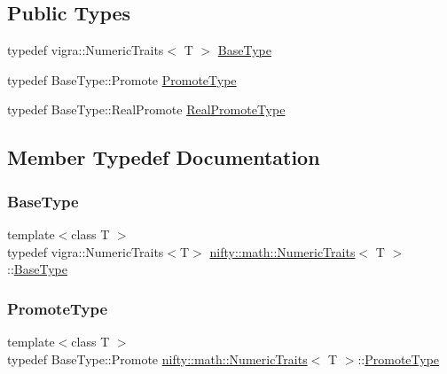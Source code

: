 \subsection*{Public Types}
\begin{DoxyCompactItemize}
\item 
typedef vigra\+::\+Numeric\+Traits$<$ T $>$ \hyperlink{structnifty_1_1math_1_1NumericTraits_abccb0907651fb8a346015c6aad17077e}{Base\+Type}
\item 
typedef Base\+Type\+::\+Promote \hyperlink{structnifty_1_1math_1_1NumericTraits_a001a907b6cbeaaf29fb52ff31261e811}{Promote\+Type}
\item 
typedef Base\+Type\+::\+Real\+Promote \hyperlink{structnifty_1_1math_1_1NumericTraits_a5030d5141aa16424cd49d272306cd716}{Real\+Promote\+Type}
\end{DoxyCompactItemize}


\subsection{Member Typedef Documentation}
\mbox{\label{structnifty_1_1math_1_1NumericTraits_abccb0907651fb8a346015c6aad17077e}} 
\subsubsection{\texorpdfstring{Base\+Type}{BaseType}}
{\footnotesize\ttfamily template$<$class T $>$ \\
typedef vigra\+::\+Numeric\+Traits$<$T$>$ \hyperlink{structnifty_1_1math_1_1NumericTraits}{nifty\+::math\+::\+Numeric\+Traits}$<$ T $>$\+::\hyperlink{structnifty_1_1math_1_1NumericTraits_abccb0907651fb8a346015c6aad17077e}{Base\+Type}}

\mbox{\label{structnifty_1_1math_1_1NumericTraits_a001a907b6cbeaaf29fb52ff31261e811}} 
\subsubsection{\texorpdfstring{Promote\+Type}{PromoteType}}
{\footnotesize\ttfamily template$<$class T $>$ \\
typedef Base\+Type\+::\+Promote \hyperlink{structnifty_1_1math_1_1NumericTraits}{nifty\+::math\+::\+Numeric\+Traits}$<$ T $>$\+::\hyperlink{structnifty_1_1math_1_1NumericTraits_a001a907b6cbeaaf29fb52ff31261e811}{Promote\+Type}}


